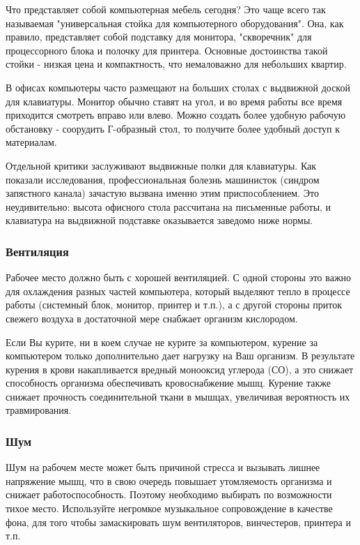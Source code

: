 \documentclass[russian,utf8,emptystyle]{eskdtext}
\begin{document}
\begin{spacing}{1.5}
Что представляет собой компьютерная мебель сегодня? Это чаще всего так называемая "универсальная стойка для компьютерного оборудования". Она, как правило, представляет собой подставку для монитора, "скворечник" для процессорного блока и полочку для принтера. Основные достоинства такой стойки - низкая цена и компактность, что немаловажно для небольших квартир.

В офисах компьютеры часто размещают на больших столах с выдвижной доской для клавиатуры. Монитор обычно ставят на угол, и во время работы все время приходится смотреть вправо или влево. Можно создать более удобную рабочую обстановку - соорудить Г-образный стол, то получите более удобный доступ к материалам. 

Отдельной критики заслуживают выдвижные полки для клавиатуры. Как показали исследования, профессиональная болезнь машинисток (синдром запястного канала) зачастую вызвана именно этим приспособлением. Это неудивительно: высота офисного стола рассчитана на письменные работы, и клавиатура на выдвижной подставке оказывается заведомо ниже нормы.
\subsubsection{Вентиляция}

Рабочее место должно быть с хорошей вентиляцией. С одной стороны это важно для охлаждения разных частей компьютера, который выделяют тепло в процессе работы (системный блок, монитор, принтер и т.п.), а с другой стороны приток свежего воздуха в достаточной мере снабжает организм кислородом.

Если Вы курите, ни в коем случае не курите за компьютером, курение за компьютером только дополнительно дает нагрузку на Ваш организм. В результате курения в крови накапливается вредный монооксид углерода (СО), а это снижает способность организма обеспечивать кровоснабжение мышц. Курение также снижает прочность соединительной ткани в мышцах, увеличивая вероятность их травмирования.

\subsubsection{Шум}

Шум на рабочем месте может быть причиной стресса и вызывать лишнее напряжение мышц, что в свою очередь повышает утомляемость организма и снижает работоспособность. Поэтому необходимо выбирать по возможности тихое место. Используйте негромкое музыкальное сопровождение в качестве фона, для того чтобы замаскировать шум вентиляторов, винчестеров, принтера и т.п. 


\end{spacing}
\end{document}
